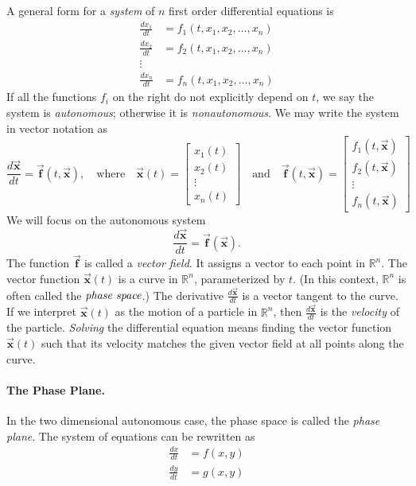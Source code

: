 \documentclass[reqno]{immbook}
\newcommand{\BF}{\vec{\textbf{f}}}
\newcommand{\BX}{\vec{\textbf{x}}}
\begin{document}
A general form for a \emph{system} of $n$ first order differential
equations is
\begin{equation}
\begin{split}
  \frac{dx_1}{dt} & = f_1(t,x_1,x_2,\ldots,x_n) \\
  \frac{dx_2}{dt} & = f_2(t,x_1,x_2,\ldots,x_n) \\
  \vdots \\
  \frac{dx_n}{dt} & = f_n(t,x_1,x_2,\ldots,x_n)
\end{split}
\end{equation}
If all the functions $f_i$ on the right do not explicitly depend on
$t$, we say the system is \emph{autonomous}; otherwise it is
\emph{nonautonomous}.
We may write the system in vector notation as
\begin{equation}
   \frac{d\BX}{dt} = \BF(t,\BX),
      \quad
      \textrm{where}
      \quad
      \BX(t) = \begin{bmatrix} x_1(t) \\ x_2(t) \\ \vdots \\ x_n(t)\end{bmatrix}
      \quad
      \textrm{and}
      \quad
      \BF(t,\BX) = \begin{bmatrix} f_1(t,\BX) \\ f_2(t,\BX) \\ \vdots \\ f_n(t,\BX) \end{bmatrix}
\end{equation}
We will focus on the autonomous system
\begin{equation}
   \frac{d\BX}{dt} = \BF(\BX).
\end{equation}
The function $\BF$ is called a \emph{vector field}.
It assigns a vector to each point in $\mathbb{R}^n$.
The vector function $\BX(t)$ is a curve in $\mathbb{R}^n$,
parameterized by $t$.
(In this context, $\mathbb{R}^n$ is often called
the $\emph{phase space}$.)
The derivative $\frac{d\BX}{dt}$ is a vector tangent to
the curve.
If we interpret $\BX(t)$ as the motion of a particle
in $\mathbb{R}^n$, then $\frac{d\BX}{dt}$ is the \emph{velocity}
of the particle.
\emph{Solving} the differential equation means finding
the vector function
$\BX(t)$ such that its velocity matches the given vector field
at all points along the curve.

\paragraph{The Phase Plane.}
In the two dimensional autonomous case, the phase space
is called the \emph{phase plane}.
The system of equations can be rewritten as
\begin{equation}
\begin{split}
    \frac{dx}{dt} & = f(x,y) \\
    \frac{dy}{dt} & = g(x,y)
\end{split}
\end{equation}
\end{document}
